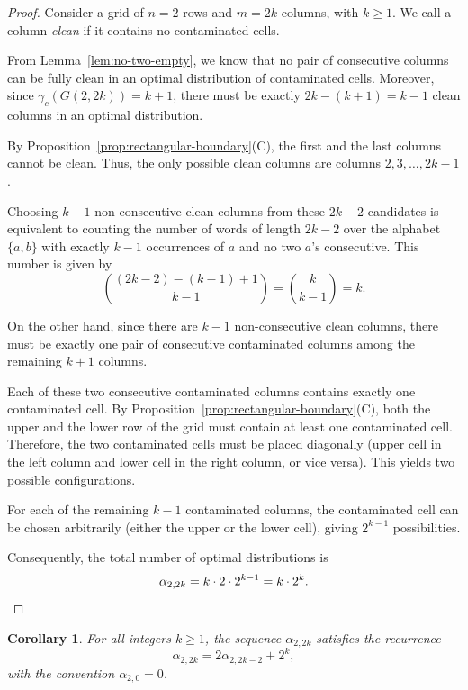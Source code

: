 \documentclass[letterpaper,12pt]{article}
\newtheorem{corollary}{Corollary}
\begin{document}
\begin{proof}
    Consider a grid of $n=2$ rows and $m=2k$ columns, with $k \geq 1$.  
    We call a column \emph{clean} if it contains no contaminated cells.  

    From Lemma~\ref{lem:no-two-empty}, we know that no pair of consecutive columns can be fully clean in an optimal distribution of contaminated cells. Moreover, since $\gamma_c(G(2,2k)) = k+1$, there must be exactly $2k - (k+1) = k-1$ clean columns in an optimal distribution.  

    By Proposition~\ref{prop:rectangular-boundary}(C), the first and the last columns cannot be clean. Thus, the only possible clean columns are  columns $2,3,\dots,2k-1$.  

    Choosing $k-1$ non-consecutive clean columns from these $2k-2$ candidates is equivalent to counting the number of words of length $2k-2$ over the alphabet $\{a,b\}$ with exactly $k-1$ occurrences of $a$ and no two $a$'s consecutive.  
    This number is given by
    \[
        \binom{(2k-2) - (k-1) + 1}{k-1} 
        = \binom{k}{k-1} 
        = k.
    \]

    On the other hand, since there are $k-1$ non-consecutive clean columns, there must be exactly one pair of consecutive contaminated columns among the remaining $k+1$ columns.  

    Each of these two consecutive contaminated columns contains exactly one contaminated cell. By Proposition~\ref{prop:rectangular-boundary}(C), both the upper and the lower row of the grid must contain at least one contaminated cell. Therefore, the two contaminated cells must be placed diagonally (upper cell in the left column and lower cell in the right column, or vice versa). This yields two possible configurations.

    For each of the remaining $k-1$ contaminated columns, the contaminated cell can be chosen arbitrarily (either the upper or the lower cell), giving $2^{k-1}$ possibilities.  

    Consequently, the total number of optimal distributions is
    \[
        \alpha_{2,2k} = k \cdot 2 \cdot 2^{k-1} = k \cdot 2^{k}.\qedhere
    \]
\end{proof}


\begin{corollary}
    For all integers $k \geq 1$, the sequence $\alpha_{2,2k}$ satisfies the recurrence
    \begin{equation} 
        \alpha_{2,2k} = 2 \alpha_{2,2k-2} + 2^k,
    \end{equation}
    with the convention $\alpha_{2,0} = 0$.
\end{corollary}
\end{document}
